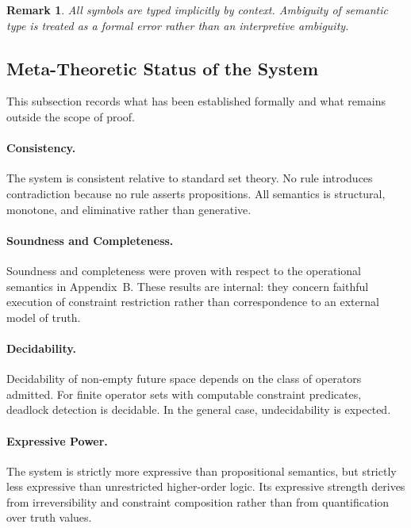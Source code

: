 \documentclass[11pt]{article}
\newtheorem{remark}{Remark}
\begin{document}
\begin{remark}
All symbols are typed implicitly by context. Ambiguity of semantic type is treated
as a formal error rather than an interpretive ambiguity.
\end{remark}

\subsection{Meta-Theoretic Status of the System}

This subsection records what has been established formally and what remains
outside the scope of proof.

\paragraph{Consistency.}
The system is consistent relative to standard set theory. No rule introduces
contradiction because no rule asserts propositions. All semantics is structural,
monotone, and eliminative rather than generative.

\paragraph{Soundness and Completeness.}
Soundness and completeness were proven with respect to the operational semantics
in Appendix~B. These results are internal: they concern faithful execution of
constraint restriction rather than correspondence to an external model of truth.

\paragraph{Decidability.}
Decidability of non-empty future space depends on the class of operators admitted.
For finite operator sets with computable constraint predicates, deadlock detection
is decidable. In the general case, undecidability is expected.

\paragraph{Expressive Power.}
The system is strictly more expressive than propositional semantics, but strictly
less expressive than unrestricted higher-order logic. Its expressive strength
derives from irreversibility and constraint composition rather than from
quantification over truth values.
\end{document}
